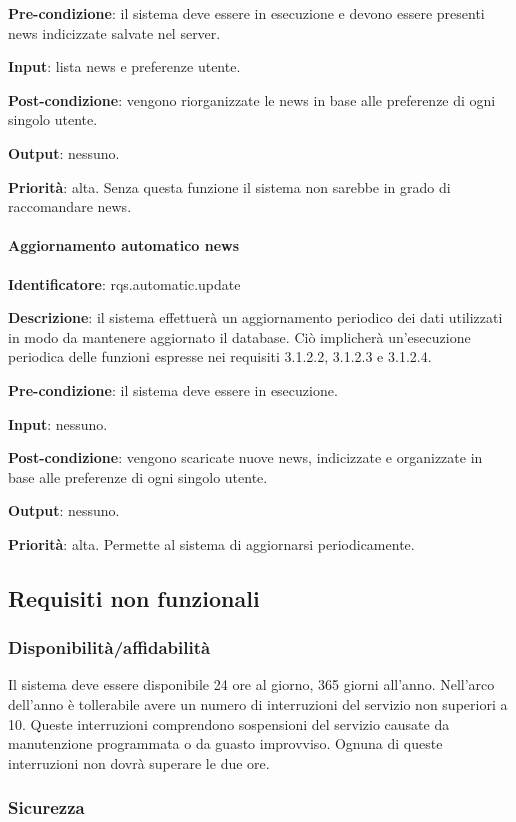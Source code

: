\documentclass[12pt]{article}
\begin{document}
\textbf{Pre-condizione}: il sistema deve essere in esecuzione e devono essere presenti news indicizzate salvate nel server.

\textbf{Input}: lista news e preferenze utente.

\textbf{Post-condizione}: vengono riorganizzate le news in base alle preferenze di ogni singolo utente.

\textbf{Output}: nessuno.

\textbf{Priorità}: alta. Senza questa funzione il sistema non sarebbe in grado di raccomandare news.

\paragraph{Aggiornamento automatico news}

\textbf{Identificatore}: rqs.automatic.update

\textbf{Descrizione}: il sistema effettuerà un aggiornamento periodico dei dati utilizzati in modo da mantenere aggiornato il database. Ciò implicherà un'esecuzione periodica delle funzioni espresse nei requisiti 3.1.2.2, 3.1.2.3 e 3.1.2.4.

\textbf{Pre-condizione}: il sistema deve essere in esecuzione.

\textbf{Input}: nessuno.

\textbf{Post-condizione}: vengono scaricate nuove news, indicizzate e organizzate in base alle preferenze di ogni singolo utente.

\textbf{Output}: nessuno.

\textbf{Priorità}: alta. Permette al sistema di aggiornarsi periodicamente.


\subsection{Requisiti non funzionali}
\subsubsection{Disponibilità/affidabilità}

Il sistema deve essere disponibile 24 ore al giorno, 365 giorni all'anno. Nell’arco dell'anno è tollerabile avere un numero di interruzioni del servizio non superiori a 10. Queste interruzioni comprendono sospensioni del servizio causate da manutenzione programmata o da guasto improvviso. Ognuna di queste interruzioni non dovrà superare le due ore.

\subsubsection{Sicurezza}
\end{document}
